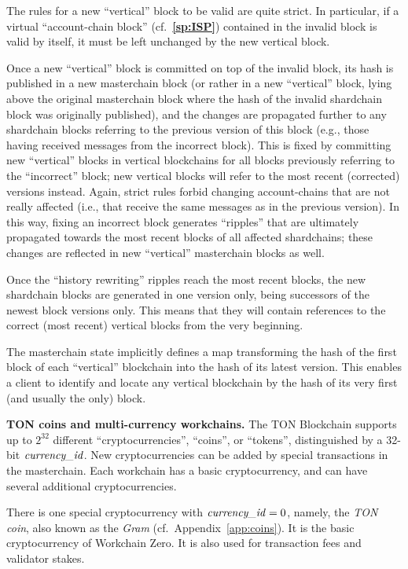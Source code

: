 \documentclass[12pt,oneside]{article}
\def\makepoint#1{\medbreak\noindent{\bf #1.\ }}
\def\nxsubpoint{\refstepcounter{subsubsection}%
  \smallbreak\makepoint{\thesubsubsection}}
\def\refpoint#1{{\rm\textbf{\ref{#1}}}}
\let\ptref=\refpoint
\def\embt(#1.){\textbf{#1.}}
\let\vr=\textit
\def\currencyid{\vr{currency\_id\/}}
\begin{document}
The rules for a new ``vertical'' block to be valid are quite
strict. In particular, if a virtual ``account-chain block''
(cf.~\ptref{sp:ISP}) contained in the invalid block is valid by
itself, it must be left unchanged by the new vertical block.

Once a new ``vertical'' block is committed on top of the invalid
block, its hash is published in a new masterchain block (or rather in
a new ``vertical'' block, lying above the original masterchain block
where the hash of the invalid shardchain block was originally
published), and the changes are propagated further to any shardchain
blocks referring to the previous version of this block (e.g., those
having received messages from the incorrect block). This is fixed by
committing new ``vertical'' blocks in vertical blockchains for all
blocks previously referring to the ``incorrect'' block; new vertical
blocks will refer to the most recent (corrected) versions
instead. Again, strict rules forbid changing account-chains that are
not really affected (i.e., that receive the same messages as in the
previous version). In this way, fixing an incorrect block generates
``ripples'' that are ultimately propagated towards the most recent
blocks of all affected shardchains; these changes are reflected in new
``vertical'' masterchain blocks as well.

Once the ``history rewriting'' ripples reach the most recent blocks,
the new shardchain blocks are generated in one version only, being
successors of the newest block versions only. This means that they
will contain references to the correct (most recent) vertical blocks
from the very beginning.

The masterchain state implicitly defines a map transforming the hash
of the first block of each ``vertical'' blockchain into the hash of
its latest version. This enables a client to identify and locate any
vertical blockchain by the hash of its very first (and usually the
only) block.

\nxsubpoint \embt(TON coins and multi-currency workchains.)  The TON
Block\-chain supports up to $2^{32}$ different ``cryptocurrencies'',
``coins'', or ``tokens'', distinguished by a 32-bit $\currencyid$. New
cryptocurrencies can be added by special transactions in the
masterchain. Each workchain has a basic cryptocurrency, and can have
several additional cryptocurrencies.

There is one special cryptocurrency with $\currencyid=0$, namely, the
{\em TON coin}, also known as the {\em Gram\/}
(cf.\ Appendix~\ref{app:coins}). It is the basic cryptocurrency of
Workchain Zero. It is also used for transaction fees and validator
stakes.
\end{document}
